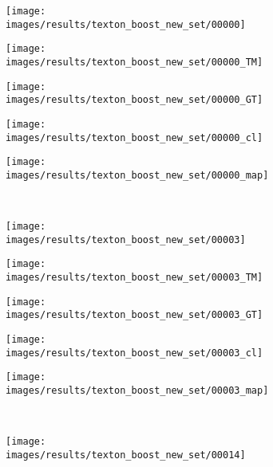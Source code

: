 \begin{figure}[t]
 \centering
 \begin{subfigure}[c]{0.19\textwidth}
  \centering
  \texttt{[image: images/results/texton\_boost\_new\_set/00000]}
 \end{subfigure}
 \begin{subfigure}[c]{0.19\textwidth}
  \centering
  \texttt{[image: images/results/texton\_boost\_new\_set/00000\_TM]}
 \end{subfigure}
 \begin{subfigure}[c]{0.19\textwidth}
  \centering
  \texttt{[image: images/results/texton\_boost\_new\_set/00000\_GT]}
 \end{subfigure}
 \begin{subfigure}[c]{0.19\textwidth}
  \centering
  \texttt{[image: images/results/texton\_boost\_new\_set/00000\_cl]}
 \end{subfigure}
 \begin{subfigure}[c]{0.19\textwidth}
  \centering
  \texttt{[image: images/results/texton\_boost\_new\_set/00000\_map]}
 \end{subfigure}
 \\
 \begin{subfigure}[c]{0.19\textwidth}
  \centering
  \texttt{[image: images/results/texton\_boost\_new\_set/00003]}
 \end{subfigure}
 \begin{subfigure}[c]{0.19\textwidth}
  \centering
  \texttt{[image: images/results/texton\_boost\_new\_set/00003\_TM]}
 \end{subfigure}
 \begin{subfigure}[c]{0.19\textwidth}
  \centering
  \texttt{[image: images/results/texton\_boost\_new\_set/00003\_GT]}
 \end{subfigure}
 \begin{subfigure}[c]{0.19\textwidth}
  \centering
  \texttt{[image: images/results/texton\_boost\_new\_set/00003\_cl]}
 \end{subfigure}
 \begin{subfigure}[c]{0.19\textwidth}
  \centering
  \texttt{[image: images/results/texton\_boost\_new\_set/00003\_map]}
 \end{subfigure}
 \\
 \begin{subfigure}[c]{0.19\textwidth}
  \centering
  \texttt{[image: images/results/texton\_boost\_new\_set/00014]}

\end{subfigure}
\end{figure}
